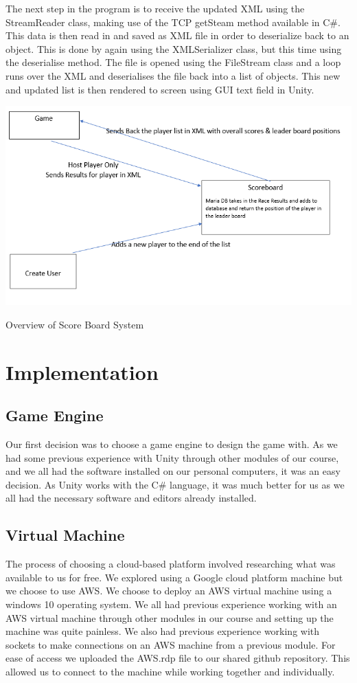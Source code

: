 The next step in the program is to receive the updated XML using the StreamReader class, making use of the TCP getSteam method available in C\#. This data is then read in and saved as XML file in order to deserialize back to an object. This is done by again using the XMLSerializer class, but this time using the deserialise method. The file is opened using the FileStream class and a loop runs over the XML and deserialises the file back into a list of objects. This new and updated list is then rendered to screen using GUI text field in Unity.
\newline

\includegraphics[width=1\columnwidth]{img/scoreBoard.PNG}

Overview of Score Board System

\newpage
\section{Implementation}

\subsection{Game Engine}
Our first decision was to choose a game engine to design the game with. As we had some previous experience with Unity through other modules of our course, and we all had the software installed on our personal computers, it was an easy decision. As Unity works with the C\# language, it was much better for us as we all had the necessary software and editors already installed.  
\subsection{Virtual Machine}
The process of choosing a cloud-based platform involved researching what was available to us for free. We explored using a Google cloud platform machine but we choose to use AWS. We choose to deploy an AWS virtual machine using a windows 10 operating system. We all had previous experience working with an AWS virtual machine through other modules in our course and setting up the machine was quite painless. We also had previous experience working with sockets to make connections on an AWS machine from a previous module. For ease of access we uploaded the AWS.rdp file to our shared github repository. This allowed us to connect to the machine while working together and individually.\newline

